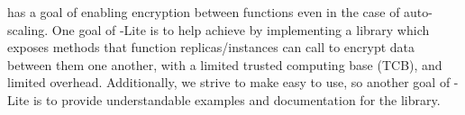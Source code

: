 

\SystemName has a goal of enabling encryption between functions even in the case of auto-scaling.
One goal of \SystemName-Lite is to help achieve \SystemName by implementing a library which exposes methods that function replicas/instances can call to encrypt data between them one another, with a limited trusted computing base (TCB), and limited overhead.
Additionally, we strive to make \SystemName easy to use, so another goal of \SystemName-Lite is to provide understandable examples and documentation for the library.

